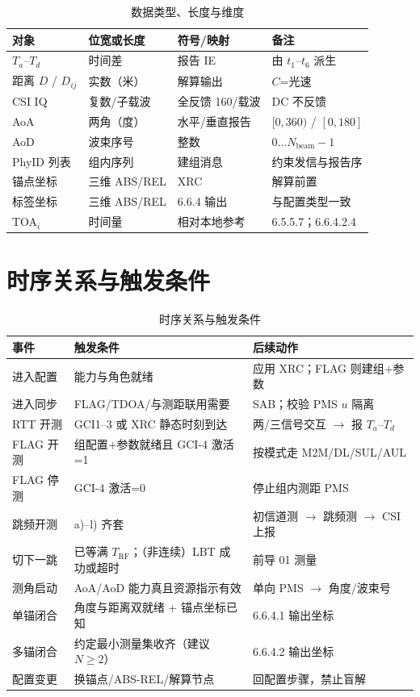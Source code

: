 \documentclass[11pt,a4paper]{ctexart}
\begin{document}
\begin{longtable}{L{3.5cm}L{3.5cm}L{3.5cm}L{3.5cm}}
\caption{数据类型、长度与维度\label{tab:66-dtype}} \\
\toprule
\textbf{对象} & \textbf{位宽或长度} & \textbf{符号/映射} & \textbf{备注} \\
\midrule
$T_a$--$T_d$ & 时间差 & 报告 IE & 由 $t_1$--$t_6$ 派生 \\
距离 $D$ / $D_{ij}$ & 实数（米） & 解算输出 & $C$=光速 \\
CSI IQ & 复数/子载波 & 全反馈 160/载波 & DC 不反馈 \\
AoA & 两角（度） & 水平/垂直报告 & $[0,360)$ / $[0,180]$ \\
AoD & 波束序号 & 整数 & $0\ldots N_{\mathrm{beam}}{-}1$ \\
PhyID 列表 & 组内序列 & 建组消息 & 约束发信与报告序 \\
锚点坐标 & 三维 ABS/REL & XRC & 解算前置 \\
标签坐标 & 三维 ABS/REL & 6.6.4 输出 & 与配置类型一致 \\
TOA$_i$ & 时间量 & 相对本地参考 & 6.5.5.7；6.6.4.2.4 \\
\bottomrule
\end{longtable}



\section{时序关系与触发条件}

\begin{longtable}{L{3.2cm}L{5.5cm}L{5cm}}
\caption{时序关系与触发条件\label{tab:66-trig}} \\
\toprule
\textbf{事件} & \textbf{触发条件} & \textbf{后续动作} \\
\midrule
进入配置 & 能力与角色就绪 & 应用 XRC；FLAG 则建组+参数 \\
进入同步 & FLAG/TDOA/与测距联用需要 & SAB；校验 PMS $u$ 隔离 \\
RTT 开测 & GCI1--3 或 XRC 静态时刻到达 & 两/三信号交互 $\rightarrow$ 报 $T_a$--$T_d$ \\
FLAG 开测 & 组配置+参数就绪且 GCI-4 激活=1 & 按模式走 M2M/DL/SUL/AUL \\
FLAG 停测 & GCI-4 激活=0 & 停止组内测距 PMS \\
跳频开测 & a)--l) 齐套 & 初信道测 $\rightarrow$ 跳频测 $\rightarrow$ CSI 上报 \\
切下一跳 & 已等满 $T_{\mathrm{RF}}$；（非连续）LBT 成功或超时 & 前导 01 测量 \\
测角启动 & AoA/AoD 能力真且资源指示有效 & 单向 PMS $\rightarrow$ 角度/波束号 \\
单锚闭合 & 角度与距离双就绪 + 锚点坐标已知 & 6.6.4.1 输出坐标 \\
多锚闭合 & 约定最小测量集收齐（建议 $N{\ge}2$） & 6.6.4.2 输出坐标 \\
配置变更 & 换锚点/ABS-REL/解算节点 & 回配置步骤，禁止盲解 \\
\bottomrule
\end{longtable}
\end{document}
